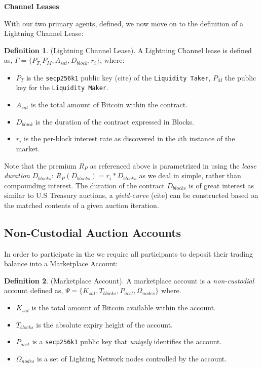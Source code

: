 \documentclass[12pt,a4paper]{article}
\theoremstyle{definition}
\newtheorem{definition}{Definition}[section]
\begin{document}
\begin{center}
\textbf{Channel Leases}
\end{center}

With our two primary agents, defined, we now move on to the definition of a
Lightning Channel Lease:

\begin{definition}{(Lightning Channel Lease).}
    A Lightning Channel lease is defined as, $\Gamma = \{P_{T,} P_{M}, A_{sat},
    D_{block}, r_{i} \}$, where:
\end{definition}

\begin{itemize}
    \item $P_{T}$ is the \texttt{secp256k1} public key (cite) of the
\texttt{Liquidity Taker}, $P_{M}$ the public key for the \texttt{Liquidity
Maker}.
    \item $A_{sat}$ is the total amount of Bitcoin within the contract.
    \item $D_{block}$ is the duration of the contract expressed in Blocks.
    \item $r_{i}$ is the per-block interest rate as discovered in the $i$th
    instance of the market.
\end{itemize}

Note that the premium $R_{P}$ as referenced above is parametrized in using the
\emph{lease duration} $D_{blocks}$: $R_{P}(D_{blocks}) = r_i * D_{blocks}$ as
we deal in simple, rather than compounding interest.  The duration of the
contract $D_{blocks}$ is of great interest as similar to U.S Treasury auctions,
a \emph{yield-curve} (cite) can be constructed based on the matched contents of
a given auction iteration. %


\subsection{Non-Custodial Auction Accounts}

In order to participate in the we require all participants to deposit their
trading balance into a Marketplace Account:

\theoremstyle{definition}
\begin{definition}{(Marketplace Account).}
A marketplace account is a \emph{non-custodial} account defined as, $\Psi =
\{K_{sat}, T_{blocks}, P_{acct}, \Omega_{nodes} \}$ where.
\end{definition}

\begin{itemize}
    \item $K_{sat}$ is the total amount of Bitcoin available within the account.
    \item $T_{blocks}$ is the absolute expiry height of the account.
    \item $P_{acct}$ is a \texttt{secp256k1} public key  that \emph{uniqely} identifies the account.
    \item $\Omega_{nodes}$ is a set of Lighting Network nodes controlled by the account.
\end{itemize}
\end{document}
